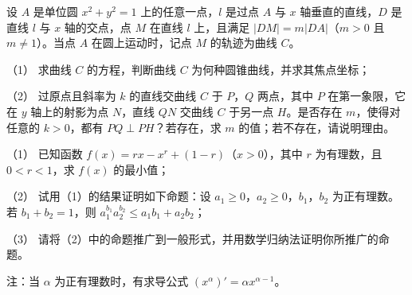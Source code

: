 \begin{question}
设 $A$ 是单位圆 $x^2+y^2=1$ 上的任意一点，$l$ 是过点 $A$ 与 $x$ 轴垂直的直线，$D$ 是直线 $l$ 与 $x$ 轴的交点，点 $M$ 在直线 $l$ 上，且满足 $|DM|=m|DA|$（$m>0$ 且 $m\neq1$）。当点 $A$ 在圆上运动时，记点 $M$ 的轨迹为曲线 $C$。

（1） 求曲线 $C$ 的方程，判断曲线 $C$ 为何种圆锥曲线，并求其焦点坐标；

（2） 过原点且斜率为 $k$ 的直线交曲线 $C$ 于 $P$，$Q$ 两点，其中 $P$ 在第一象限，它在 $y$ 轴上的射影为点 $N$，直线 $QN$ 交曲线 $C$ 于另一点 $H$。是否存在 $m$，使得对任意的 $k>0$，都有 $PQ\perp PH$？若存在，求 $m$ 的值；若不存在，请说明理由。

\end{question}
\begin{question}
（1） 已知函数 $f(x)=rx-x^r+(1-r)$（$x>0$），其中 $r$ 为有理数，且 $0<r<1$，求 $f(x)$ 的最小值；

（2） 试用（1）的结果证明如下命题：设 $a_1\geqslant0$，$a_2\geqslant0$，$b_1$，$b_2$ 为正有理数。若 $b_1+b_2=1$，则 $a_1^{b_1}a_2^{b_2}\leqslant a_1b_1+a_2b_2$；

（3） 请将（2）中的命题推广到一般形式，并用数学归纳法证明你所推广的命题。

注：当 $\alpha$ 为正有理数时，有求导公式 $(x^\alpha)'=\alpha x^{\alpha-1}$。

\end{question}